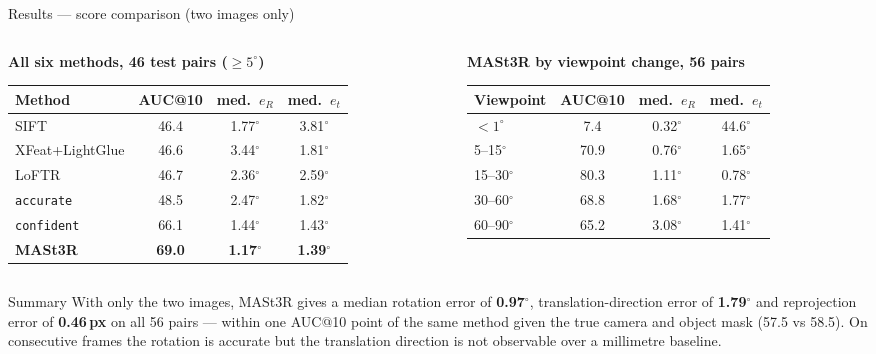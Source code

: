 \documentclass[aspectratio=169,10pt]{beamer}
\begin{document}
\begin{frame}{Results --- score comparison (two images only)}
  \begin{columns}[c]
    \begin{column}{0.5\textwidth}
      \centering\small
      \textbf{All six methods, 46 test pairs ($\ge5^\circ$)}\\[3pt]
      \begin{tabular}{lccc}
        \toprule
        Method & AUC@10 & med.\ $e_R$ & med.\ $e_t$\\
        \midrule
        SIFT & 46.4 & 1.77$^\circ$ & 3.81$^\circ$\\
        XFeat+LightGlue & 46.6 & 3.44$^\circ$ & 1.81$^\circ$\\
        LoFTR & 46.7 & 2.36$^\circ$ & 2.59$^\circ$\\
        \texttt{accurate} & 48.5 & 2.47$^\circ$ & 1.82$^\circ$\\
        \texttt{confident} & 66.1 & 1.44$^\circ$ & 1.43$^\circ$\\
        \textbf{MASt3R} & \textbf{69.0} & \textbf{1.17}$^\circ$ & \textbf{1.39}$^\circ$\\
        \bottomrule
      \end{tabular}
    \end{column}
    \begin{column}{0.46\textwidth}
      \centering\small
      \textbf{MASt3R by viewpoint change, 56 pairs}\\[3pt]
      \begin{tabular}{lccc}
        \toprule
        Viewpoint & AUC@10 & med.\ $e_R$ & med.\ $e_t$\\
        \midrule
        $<1^\circ$ & 7.4 & 0.32$^\circ$ & 44.6$^\circ$\\
        5--15$^\circ$ & 70.9 & 0.76$^\circ$ & 1.65$^\circ$\\
        15--30$^\circ$ & 80.3 & 1.11$^\circ$ & 0.78$^\circ$\\
        30--60$^\circ$ & 68.8 & 1.68$^\circ$ & 1.77$^\circ$\\
        60--90$^\circ$ & 65.2 & 3.08$^\circ$ & 1.41$^\circ$\\
        \bottomrule
      \end{tabular}
    \end{column}
  \end{columns}
  \vspace{10pt}
  \begin{block}{Summary}
    With only the two images, MASt3R gives a median rotation error of \textbf{0.97$^\circ$}, translation-direction error of \textbf{1.79$^\circ$} and reprojection error of \textbf{0.46\,px} on all 56 pairs --- within one AUC@10 point of the same method given the true camera and object mask (57.5 vs 58.5). On consecutive frames the rotation is accurate but the translation direction is not observable over a millimetre baseline.
  \end{block}
\end{frame}
\end{document}
